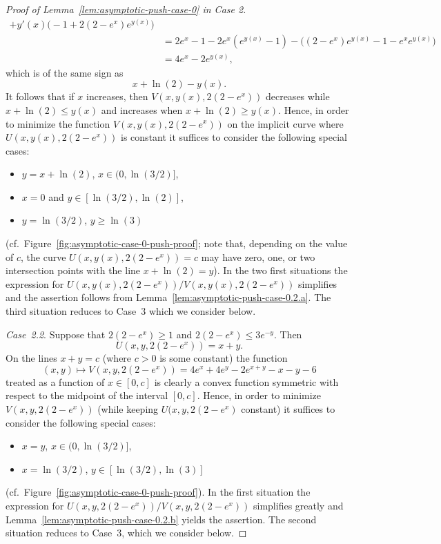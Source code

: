 \documentclass[a4paper]{amsart} %
\theoremstyle{definition}
\theoremstyle{remark}
\numberwithin{equation}{section}
\newcommand*{\XXXasymptoticDenominator}{V}
\newcommand*{\XXXasymptoticNominator}{U}
\begin{document}
\begin{proof}[Proof of Lemma~\ref{lem:asymptotic-push-case-0} in Case 2]
\begin{align*}
	+ y'(x)\bigl( - 1  + 2(2-e^{x}) e^{y(x)} \bigr) \\
	&=2e^{x} - 1 - 2e^{x} (e^{y(x)} - 1) 
	 - \bigl((2-e^{x})e^{y(x)} - 1 -e^{x} e^{y(x)}\bigr) \\
	 &=4e^x  - 2e^{y(x)},
	\end{align*}
	which is of the same sign as
	\[
	x + \ln(2) - y(x). 
	\]
	It follows that if $x$ increases,
	then $\XXXasymptoticDenominator(x,y(x),2(2-e^x))$ decreases while $x + \ln(2)  \leq  y(x)$ 
	and increases when $x + \ln(2) \geq y(x)$.
	Hence, in order to minimize the function  $\XXXasymptoticDenominator(x, y(x), 2(2-e^{x}))$
	 on the implicit curve where $\XXXasymptoticNominator(x,y(x), 2(2-e^x))$ is constant
	it suffices to consider the following special cases:
	\begin{itemize}
		\item $y = x + \ln(2)$, $x \in (0, \ln(3/2)]$,
		\item $x = 0$ and $y \in [\ln(3/2), \ln(2)]$,
		\item $y = \ln(3/2)$, $y\geq \ln(3)$
	\end{itemize}
(cf.~Figure~\ref{fig:asymptotic-case-0-push-proof};
 note that, depending on the value of $c$,
  the curve $\XXXasymptoticNominator(x,y(x), 2(2-e^x)) = c$
  may have zero, one, or two intersection points
   with the line $x + \ln(2) = y$).
In the two first situations 
the expression for $\XXXasymptoticNominator(x,y(x), 2(2-e^x))/\XXXasymptoticDenominator(x,y(x), 2(2-e^x))$ simplifies and the assertion follows from Lemma~\ref{lem:asymptotic-push-case-0.2.a}.
The third situation reduces to Case~3
 which we consider below.
	
	
	
	
	
	\emph{Case~2.2}. Suppose that $2(2-e^x) \geq 1 $ and $2(2-e^x) \leq 3e^{-y}$.
	Then
	\begin{equation*}
	\XXXasymptoticNominator(x,y,2(2-e^x)) = x + y.
	\end{equation*}
	On the lines $x + y = c$ (where $c>0$ is some constant)
	the function
	\[ (x,y)\mapsto \XXXasymptoticDenominator(x,y,2(2-e^x)) =  4e^x + 4 e^y -2e^{x+y} -x -y - 6
	\]
	treated as a function of $x\in[0,c]$ is clearly a convex function symmetric with respect to the midpoint of the interval $[0,c]$.
	Hence, in order to minimize $\XXXasymptoticDenominator(x,y, 2(2-e^x))$
	(while keeping $\XXXasymptoticNominator(x,y,2(2-e^x)$ constant)
	it suffices to consider  the following special cases:
	\begin{itemize}
		\item $x=y$, $x\in(0,\ln(3/2)]$,
		\item $x=\ln(3/2)$, $y\in[\ln(3/2),\ln(3)]$
	\end{itemize}
(cf.~Figure~\ref{fig:asymptotic-case-0-push-proof}).
	In the first situation the expression
	 for $U(x,y, 2(2-e^x))/V(x,y, 2(2-e^x))$ simplifies greatly
	  and Lemma~\ref{lem:asymptotic-push-case-0.2.b} yields the assertion. 
	The second situation reduces to Case~3, which we consider below.
	\end{proof}
	
\end{document}
